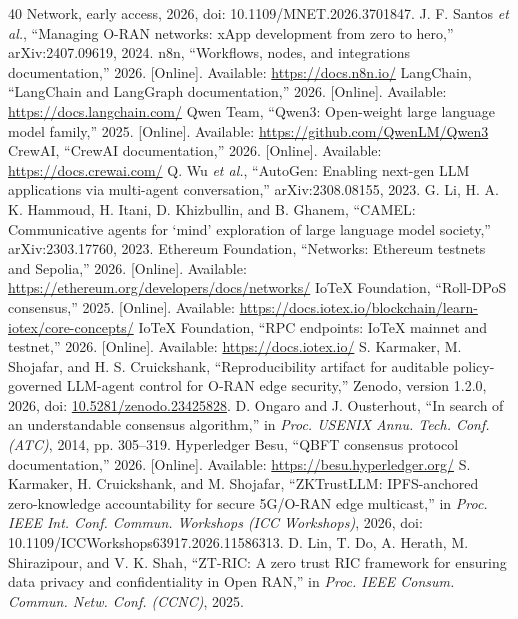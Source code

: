 \documentclass[journal]{IEEEtran}
\newif\ifshowrevisions
\newcommand{\rev}[1]{{\ifshowrevisions\color{blue}\else\color{black}\fi #1}}
\begin{document}
\begin{thebibliography}{40}
{Network}, early access, 2026, doi: 10.1109/MNET.2026.3701847.
J. F. Santos \emph{et al.}, ``Managing O-RAN networks: xApp development from
zero to hero,'' arXiv:2407.09619, 2024.
n8n, ``Workflows, nodes, and integrations documentation,'' 2026. [Online].
Available: \url{https://docs.n8n.io/}
LangChain, ``LangChain and LangGraph documentation,'' 2026. [Online].
Available: \url{https://docs.langchain.com/}
Qwen Team, ``Qwen3: Open-weight large language model family,'' 2025.
[Online]. Available: \url{https://github.com/QwenLM/Qwen3}
CrewAI, ``CrewAI documentation,'' 2026. [Online]. Available:
\url{https://docs.crewai.com/}
Q. Wu \emph{et al.}, ``AutoGen: Enabling next-gen LLM applications via
multi-agent conversation,'' arXiv:2308.08155, 2023.
G. Li, H. A. K. Hammoud, H. Itani, D. Khizbullin, and B. Ghanem, ``CAMEL:
Communicative agents for `mind' exploration of large language model society,''
arXiv:2303.17760, 2023.
Ethereum Foundation, ``Networks: Ethereum testnets and Sepolia,'' 2026.
[Online]. Available: \url{https://ethereum.org/developers/docs/networks/}
IoTeX Foundation, ``Roll-DPoS consensus,'' 2025. [Online]. Available:
\url{https://docs.iotex.io/blockchain/learn-iotex/core-concepts/}
IoTeX Foundation, ``RPC endpoints: IoTeX mainnet and testnet,'' 2026.
[Online]. Available: \url{https://docs.iotex.io/}
\rev{S. Karmaker, M. Shojafar, and H. S. Cruickshank, ``Reproducibility artifact
for auditable policy-governed LLM-agent control for O-RAN edge security,''
Zenodo, version 1.2.0, 2026, doi:
\url{10.5281/zenodo.23425828}.}
D. Ongaro and J. Ousterhout, ``In search of an understandable consensus
algorithm,'' in \emph{Proc. USENIX Annu. Tech. Conf. (ATC)}, 2014,
pp. 305--319.
Hyperledger Besu, ``QBFT consensus protocol documentation,'' 2026. [Online].
Available: \url{https://besu.hyperledger.org/}
S. Karmaker, H. Cruickshank, and M. Shojafar, ``ZKTrustLLM: IPFS-anchored
zero-knowledge accountability for secure 5G/O-RAN edge multicast,'' in
\emph{Proc. IEEE Int. Conf. Commun. Workshops (ICC Workshops)}, 2026, doi:
10.1109/ICCWorkshops63917.2026.11586313.
D. Lin, T. Do, A. Herath, M. Shirazipour, and V. K. Shah, ``ZT-RIC: A zero
trust RIC framework for ensuring data privacy and confidentiality in Open
RAN,'' in \emph{Proc. IEEE Consum. Commun. Netw. Conf. (CCNC)}, 2025.

\end{thebibliography}
\end{document}
